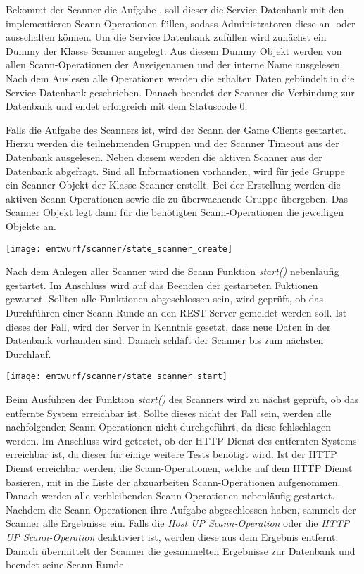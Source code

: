Bekommt der Scanner die Aufgabe , soll dieser die Service Datenbank mit den implementieren Scann-Operationen füllen, sodass Administratoren diese an- oder ausschalten können. Um die Service Datenbank zufüllen wird zunächst ein Dummy der Klasse Scanner angelegt. Aus diesem Dummy Objekt werden von allen Scann-Operationen der Anzeigenamen und der interne Name ausgelesen. Nach dem Auslesen alle Operationen werden die erhalten Daten gebündelt in die Service Datenbank geschrieben. Danach beendet der Scanner die Verbindung zur Datenbank und endet erfolgreich mit dem Statuscode 0.

Falls die Aufgabe des Scanners  ist, wird der Scann der Game Clients gestartet. Hierzu werden die teilnehmenden Gruppen und der Scanner Timeout aus der Datenbank ausgelesen. Neben diesem werden die aktiven Scanner aus der Datenbank abgefragt. Sind all Informationen vorhanden, wird für jede Gruppe ein Scanner Objekt der Klasse Scanner erstellt. Bei der Erstellung werden die aktiven Scann-Operationen sowie die zu überwachende Gruppe übergeben. Das Scanner Objekt legt dann für die benötigten Scann-Operationen die jeweiligen Objekte an.

\begin{center}
	\texttt{[image: entwurf/scanner/state\_scanner\_create]}
	\label{fig:scanner-create-state}
\end{center}

Nach dem Anlegen aller Scanner wird die Scann Funktion \textit{start()} nebenläufig gestartet. Im Anschluss wird auf das Beenden der gestarteten Fuktionen gewartet. Sollten alle Funktionen abgeschlossen sein, wird geprüft, ob das Durchführen einer Scann-Runde an den REST-Server gemeldet werden soll. Ist dieses der Fall, wird der Server in Kenntnis gesetzt, dass neue Daten in der Datenbank vorhanden sind. Danach schläft der Scanner bis zum nächsten Durchlauf.

\begin{center}
	\texttt{[image: entwurf/scanner/state\_scanner\_start]}
\end{center}

Beim Ausführen der Funktion \textit{start()} des Scanners wird zu nächst geprüft, ob das entfernte System erreichbar ist. Sollte dieses nicht der Fall sein, werden alle nachfolgenden Scann-Operationen nicht durchgeführt, da diese fehlschlagen werden. Im Anschluss wird getestet, ob der HTTP Dienst des entfernten Systems erreichbar ist, da dieser für einige weitere Tests benötigt wird. Ist der HTTP Dienst erreichbar werden, die Scann-Operationen, welche auf dem HTTP Dienst basieren, mit in die Liste der abzuarbeiten Scann-Operationen aufgenommen. Danach werden alle verbleibenden Scann-Operationen nebenläufig gestartet. Nachdem die Scann-Operationen ihre Aufgabe abgeschlossen haben, sammelt der Scanner alle Ergebnisse ein. Falls die \textit{Host UP Scann-Operation} oder die \textit{HTTP UP Scann-Operation} deaktiviert ist, werden diese aus dem Ergebnis entfernt. Danach übermittelt der Scanner die gesammelten Ergebnisse zur Datenbank und beendet seine Scann-Runde.

